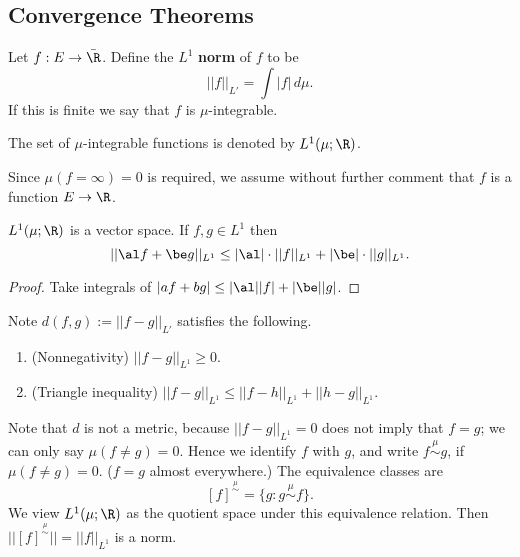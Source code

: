 
\subsection{Convergence Theorems}

\begin{df}
Let $f:E\to \bar{\R}$.
Define the $L^1$ \textbf{norm} of $f$ to be
\[
||f||_{L'}=\int |f|\,d\mu.
\]
If this is finite we say that $f$ is $\mu$-integrable.

The set of $\mu$-integrable functions is denoted by $L^1(\mu;\R)$.
\end{df}
Since %
$\mu(f=\infty)=0$ is required, we assume without further comment that $f$ is a function $E\to \R$.

\begin{pr}
$L^1(\mu;\R)$ is a vector space. If $f,g\in L^1$ then
\[
||\al f+\be g||_{L^1}\leq |\al|\cdot ||f||_{L^1}+|\be|\cdot ||g||_{L^1}.
\]
\end{pr}
\begin{proof}
Take integrals of $|af+bg|\leq |\al||f|+|\be||g|$.
\end{proof}
Note $d(f,g):=||f-g||_{L'}$ satisfies the following.
\begin{enumerate}
\item (Nonnegativity) $||f-g||_{L^1}\geq 0$.
\item (Triangle inequality) $||f-g||_{L^1}\leq ||f-h||_{L^1}+||h-g||_{L^1}$.
\end{enumerate}

Note that $d$ is not a metric, because $||f-g||_{L^1}=0$ does not imply that $f=g$; we can only say $\mu(f\neq g)=0$. Hence we identify $f$ with $g$, and write $f\stackrel{\mu}{\sim} g$, if $\mu(f\neq g)=0$. ($f=g$ almost everywhere.) The equivalence classes are
\[
[f]^{\stackrel{\mu}{\sim}}=\{g:g\stackrel{\mu}{\sim}f\}.
\]
We view $L^1(\mu;\R)$ as the quotient space under this equivalence relation. Then $||[f]^{\stackrel{\mu}{\sim}}||=||f||_{L^1}$ is a norm.

